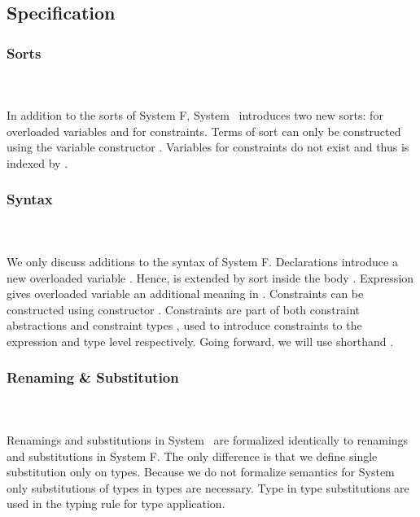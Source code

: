 \subsection{Specification}

\subsubsection{Sorts}\hfill\\\\
In addition to the sorts of System F, System \Fo\ introduces two new sorts:  for overloaded variables and  for constraints.
\FoSort
Terms of sort  can only be constructed using the variable constructor .
Variables for constraints do not exist and thus  is indexed by .

\subsubsection{Syntax}\hfill\\\\
We only discuss additions to the syntax of System F.
\FoTerm
Declarations   introduce a new overloaded variable . 
Hence,  is extended by sort  inside the body . 
Expression    \Constr{=}    gives overloaded variable  an additional meaning  in . 
Constraints  can be constructed using constructor   \Constr{:} . 
Constraints are part of both constraint abstractions \Constr{\lambdabar}    and constraint types \Constr{[}  \Constr{]⇒} , used to introduce constraints to the expression and type level respectively.
Going forward, we will use shorthand \FoCstr.

\subsubsection{Renaming \& Substitution}\hfill\\\\
Renamings and substitutions in System \Fo\ are formalized identically to renamings and substitutions in System F. The only difference is that we define single substitution only on types. 
\Fosubs
Because we do not formalize semantics for System \Fo\, only substitutions of types in types are necessary. Type in type substitutions are used in the typing rule for type application.

